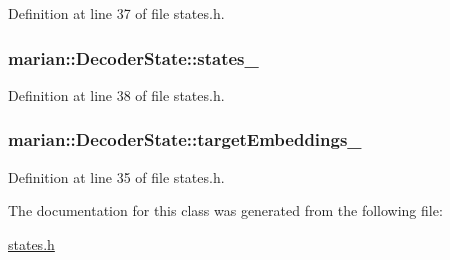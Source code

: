 Definition at line 37 of file states.\+h.

\subsubsection[{\texorpdfstring{states\+\_\+}{states_}}]{ marian\+::\+Decoder\+State\+::states\+\_\+\hspace{0.3cm}{\ttfamily [protected]}}\hypertarget{classmarian_1_1DecoderState_a999eed11d80cfd9cb80fc63550633062}{}\label{classmarian_1_1DecoderState_a999eed11d80cfd9cb80fc63550633062}


Definition at line 38 of file states.\+h.

\subsubsection[{\texorpdfstring{target\+Embeddings\+\_\+}{targetEmbeddings_}}]{ marian\+::\+Decoder\+State\+::target\+Embeddings\+\_\+\hspace{0.3cm}{\ttfamily [protected]}}\hypertarget{classmarian_1_1DecoderState_a67f590c5a27b165002f52f1fcfaa2c5f}{}\label{classmarian_1_1DecoderState_a67f590c5a27b165002f52f1fcfaa2c5f}


Definition at line 35 of file states.\+h.



The documentation for this class was generated from the following file\+:\begin{DoxyCompactItemize}
\item 
\hyperlink{states_8h}{states.\+h}\end{DoxyCompactItemize}
